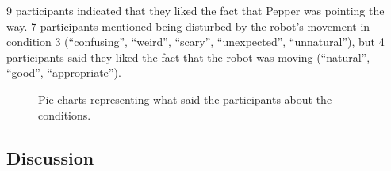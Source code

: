 \documentclass[a4paper,11pt,twoside]{StyleThese}
\begin{document}
9 participants indicated that they liked the fact that Pepper was pointing the way. 7 participants mentioned being disturbed by the robot's movement in condition 3 (``confusing'', ``weird'', ``scary'', ``unexpected'', ``unnatural''), but 4 participants said they liked the fact that the robot was moving (``natural'', ``good'', ``appropriate'').

\begin{figure}[!htb]
	\centering
	
	\hfill
	
	\hfill
	\caption{Pie charts representing what said the participants about the conditions.}
	\label{chap8:fig:interview}
\end{figure} 

\subsection{Discussion}
\end{document}
